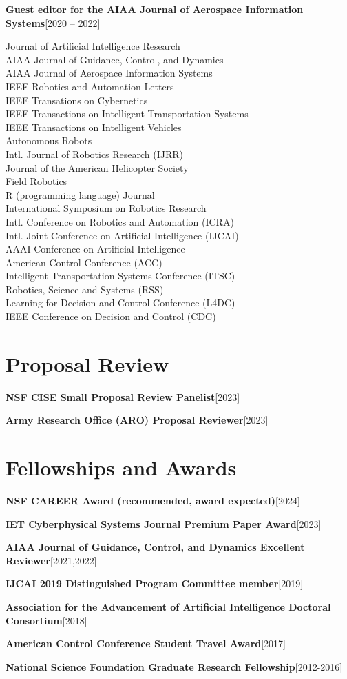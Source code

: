 \documentclass[10pt,roman]{moderncv}
\newcommand{\mycvitem}[2]{
    \textbf{#2}\hfill [#1]\break
}
\begin{document}
\mycvitem{2020 -- 2022}{Guest editor for the AIAA Journal of Aerospace Information Systems}

\vspace{-2ex}
\begin{multicols}{2}
\small
Journal of Artificial Intelligence Research\\
AIAA Journal of Guidance, Control, and Dynamics\\
AIAA Journal of Aerospace Information Systems\\
IEEE Robotics and Automation Letters\\
IEEE Transations on Cybernetics\\
IEEE Transactions on Intelligent Transportation Systems\\
IEEE Transactions on Intelligent Vehicles\\
Autonomous Robots\\
Intl. Journal of Robotics Research (IJRR)\\
Journal of the American Helicopter Society\\
Field Robotics\\
R (programming language) Journal\\
International Symposium on Robotics Research\\
Intl. Conference on Robotics and Automation (ICRA)\\
Intl. Joint Conference on Artificial Intelligence (IJCAI)\\
AAAI Conference on Artificial Intelligence\\
American Control Conference (ACC)\\
Intelligent Transportation Systems Conference (ITSC)\\
Robotics, Science and Systems (RSS)\\
Learning for Decision and Control Conference (L4DC)\\
IEEE Conference on Decision and Control (CDC)\\
\end{multicols}

\section{Proposal Review}
\mycvitem{2023}{NSF CISE Small Proposal Review Panelist}
\mycvitem{2023}{Army Research Office (ARO) Proposal Reviewer}

\section{Fellowships and Awards}

\mycvitem{2024}{NSF CAREER Award (recommended, award expected)}
\mycvitem{2023}{IET Cyberphysical Systems Journal Premium Paper Award}
\mycvitem{2021,2022}{AIAA Journal of Guidance, Control, and Dynamics Excellent Reviewer}
\mycvitem{2019}{IJCAI 2019 Distinguished Program Committee member}
\mycvitem{2018}{Association for the Advancement of Artificial Intelligence Doctoral Consortium}
\mycvitem{2017}{American Control Conference Student Travel Award}
\mycvitem{2012-2016}{National Science Foundation Graduate Research Fellowship}
\end{document}
